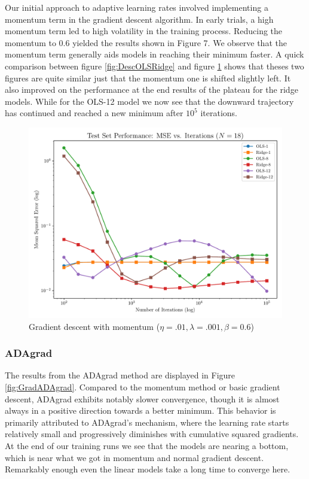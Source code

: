 \documentclass[twocolumn,aps]{revtex4}
\begin{document}
Our initial approach to adaptive learning rates involved implementing a momentum term in the gradient descent algorithm. 
In early trials, a high momentum term led to high volatility in the training process. 
Reducing the momentum to $0.6$ yielded the results shown in Figure 7. 
We observe that the momentum term generally aids models in reaching their minimum faster.
A quick comparison between figure \ref{fig:DescOLSRidge} and figure \ref{fig:GradMomentum} shows that theses two figures are quite similar just that the momentum one is shifted slightly left.
It also improved on the performance at the end results of the plateau for the ridge models.
While for the OLS-12 model we now see that the downward trajectory has continued and reached a new minimum after $10^5$ iterations.
\\
\begin{figure}[h]
    \centering
    \includegraphics[width=.95 \linewidth]{Figures/OLS_Ridge_Momentum.pdf}
    \caption{Gradient descent with momentum ($\eta=.01, \lambda=.001, \beta=0.6$)}
    \label{fig:GradMomentum}
\end{figure}


\subsubsection{ADAgrad}

The results from the ADAgrad method are displayed in Figure \ref{fig:GradADAgrad}. 
Compared to the momentum method or basic gradient descent, ADAgrad exhibits notably slower convergence, though it is almost always in a positive direction towards a better minimum. 
This behavior is primarily attributed to ADAgrad's mechanism, where the learning rate starts relatively small and progressively diminishes with cumulative squared gradients.
At the end of our training runs we see that the models are nearing a bottom, which is near what we got in momentum and normal gradient descent.
Remarkably enough even the linear models take a long time to converge here.
\\
\end{document}
